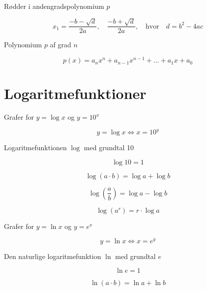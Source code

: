 \documentclass[11pt,a4paper,landscape,twocolumn,fleqn,leqno]{article}
\begin{document}
Rødder i andengradspolynomium $p$

\begin{equation}
x_1 = \frac{-b - \sqrt{d}}{2a}, \quad \frac{-b + \sqrt{d}}{2a}, \quad \text{hvor} \quad d = b^2 - 4ac
\end{equation}

Polynomium $p$ af grad $n$

\begin{equation}
p(x) = a_nx^n + a_{n-1}x^{n-1} + \dots + a_1x + a_0
\end{equation}

\vfill

\section{Logaritmefunktioner}

Grafer for $y = \log x$ og $y = 10^x$

\begin{equation}
y = \log x \Leftrightarrow x = 10^y
\end{equation}

Logaritmefunktionen $\log$ med grundtal 10

\begin{equation}
\log 10 = 1
\end{equation}

\begin{equation}
\log(a \cdot b) = \log a + \log b
\end{equation}

\begin{equation}
\log\left(\frac{a}{b}\right) = \log a - \log b
\end{equation}

\begin{equation}
\log(a^r) = r \cdot \log a
\end{equation}

Grafer for $y = \ln x$ og $y = e^x$

\begin{equation}
y = \ln x \Leftrightarrow x = e^y
\end{equation}

Den naturlige logaritmefunktion $\ln$ med grundtal $e$

\begin{equation}
\ln e = 1
\end{equation}

\begin{equation}
\ln (a \cdot b) = \ln a + \ln b
\end{equation}
\end{document}
